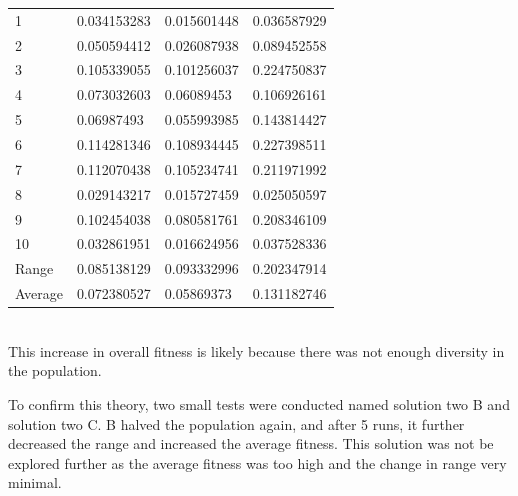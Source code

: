 \documentclass[sigconf]{acmart}
\begin{document}
%
%
\begin{supertabular}{p{0.1\columnwidth}p{0.25\columnwidth}p{0.25\columnwidth}p{0.25\columnwidth}}
    1&0.034153283&0.015601448&0.036587929\\
    2&0.050594412&0.026087938&0.089452558\\
    3&0.105339055&0.101256037&0.224750837\\
    4&0.073032603&0.06089453&0.106926161\\
    5&0.06987493&0.055993985&0.143814427\\
    6&0.114281346&0.108934445&0.227398511\\
    7&0.112070438&0.105234741&0.211971992\\
    8&0.029143217&0.015727459&0.025050597\\
    9&0.102454038&0.080581761&0.208346109\\
    10&0.032861951&0.016624956&0.037528336\\
    Range&0.085138129&0.093332996&0.202347914\\
    Average&0.072380527&0.05869373&0.131182746\\
    
\end{supertabular}%
\\
This increase in overall fitness is likely because there was not enough diversity in the population.

To confirm this theory, two small tests were conducted named solution two B and solution two C. B halved the population again, and after 5 runs, it further decreased the range and increased the average fitness. This solution was not be explored further as the average fitness was too high and the change in range very minimal.
\end{document}
